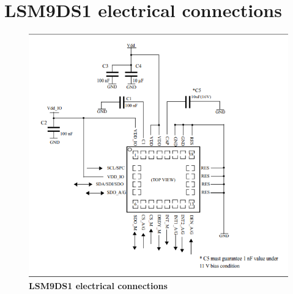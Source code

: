 \newpage
\section{LSM9DS1 electrical connections}

\begin{figure}[h!]
	\centering	\includegraphics[width=\linewidth]{Images/elecon}
	\caption{\textbf{LSM9DS1 electrical connections}} 
\end{figure}
